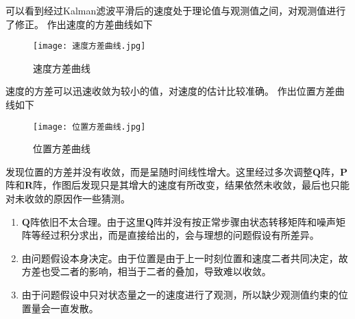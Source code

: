 \documentclass{ctexart}
\begin{document}
可以看到经过Kalman滤波平滑后的速度处于理论值与观测值之间，对观测值进行了修正。
\newpage
作出速度的方差曲线如下
\begin{figure}[H]
\texttt{[image: 速度方差曲线.jpg]}
\caption{速度方差曲线}
\end{figure}

速度的方差可以迅速收敛为较小的值，对速度的估计比较准确。
\newpage
作出位置方差曲线如下
\begin{figure}[H]
\texttt{[image: 位置方差曲线.jpg]}
\caption{位置方差曲线}
\end{figure}

发现位置的方差并没有收敛，而是呈随时间线性增大。这里经过多次调整$\bm{Q}$阵，$\bm{P}$阵和$\bm{R}$阵，作图后发现只是其增大的速度有所改变，结果依然未收敛，最后也只能对未收敛的原因作一些猜测。
\begin{enumerate}[(1)]
\item $\bm{Q}$阵依旧不太合理。由于这里$\bm{Q}$阵并没有按正常步骤由状态转移矩阵和噪声矩阵等经过积分求出，而是直接给出的，会与理想的问题假设有所差异。
\item 由问题假设本身决定。由于位置是由于上一时刻位置和速度二者共同决定，故方差也受二者的影响，相当于二者的叠加，导致难以收敛。
\item 由于问题假设中只对状态量之一的速度进行了观测，所以缺少观测值约束的位置量会一直发散。
\end{enumerate}
\end{document}
